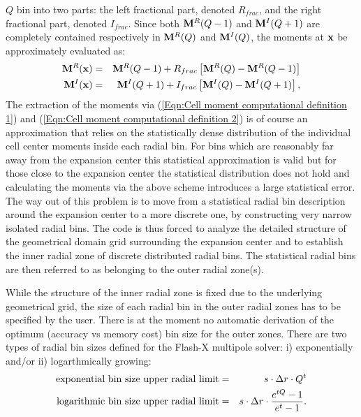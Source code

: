 $Q$ bin into two parts: the left fractional part, denoted $R_{frac}$, and the right
fractional part, denoted $I_{frac}$. Since both ${\bf M}^R(Q-1)$ and ${\bf M}^I(Q+1)$
are completely contained respectively in ${\bf M}^R(Q)$ and ${\bf M}^I(Q)$, the
moments at ${\bf x}$ be approximately evaluated as:
\begin{eqnarray}
{\bf M}^R({\bf x}) & = &  {\bf M}^R(Q-1) + R_{frac}\left[{\bf M}^R(Q)-{\bf M}^R(Q-1)\right]
\label{Eqn:Cell moment computational definition 1} \\
{\bf M}^I({\bf x}) & = &  {\bf M}^I(Q+1) + I_{frac}\left[{\bf M}^I(Q)-{\bf M}^I(Q+1)\right],
\label{Eqn:Cell moment computational definition 2}
\end{eqnarray}
The extraction of the moments via (\ref{Eqn:Cell moment computational definition 1})
and (\ref{Eqn:Cell moment computational definition 2}) is
of course an approximation that relies on the statistically dense distribution of the individual
cell center moments inside each radial bin. For bins which are reasonably far away from the expansion
center this statistical approximation is valid but for those close to the expansion center the
statistical distribution does not hold and calculating the moments via the above scheme
introduces a large statistical error. The way out of this problem is to move from a statistical
radial bin description around the expansion center to a more discrete one, by constructing very narrow
isolated radial bins. The code is thus forced to analyze the detailed structure of the geometrical domain
grid surrounding the expansion center and to establish the inner radial zone of discrete distributed
radial bins. The statistical radial bins are then referred to as belonging to the outer radial zone(s).
\par
While the structure of the inner radial zone is fixed due to the underlying geometrical grid,
the size of each radial bin in the outer radial zones has to be specified by the user. There is
at the moment no automatic derivation of the optimum (accuracy vs memory cost)
bin size for the outer zones. There are two types of radial bin sizes defined for the Flash-X
multipole solver: i) exponentially and/or ii) logarthmically growing:
\begin{eqnarray}
\mbox{exponential bin size upper radial limit} & = & s\cdot \Delta r \cdot Q^t
\label{Eqn:Exponential bin definition} \\
\mbox{logarithmic bin size upper radial limit} & = & s\cdot \Delta r \cdot {e^{tQ}-1\over e^t-1}.
\label{Eqn:Logarithmic bin definition}
\end{eqnarray}

